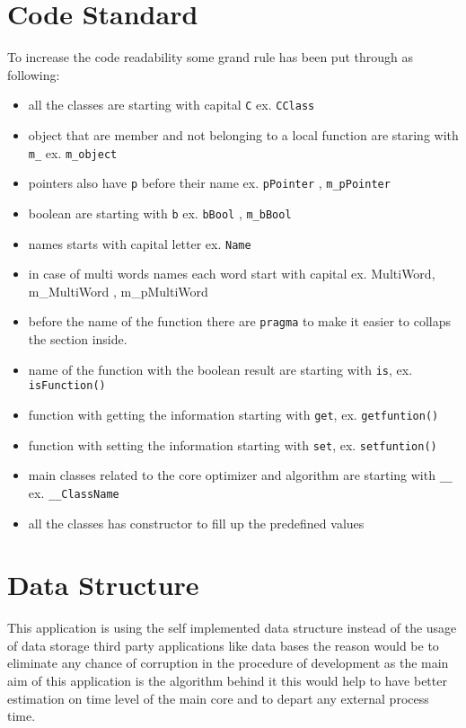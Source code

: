 \documentclass[oneside,titlepage,12pt]{memoir}
\begin{document}
\section{Code Standard}\label{code-standard}

To increase the code readability some grand rule has been put through as
following:

\begin{itemize}
\itemsep1pt\parskip0pt
\item
  all the classes are starting with capital \texttt{C} ex.
  \texttt{CClass}
\item
  object that are member and not belonging to a local function are
  staring with \texttt{m\_} ex. \texttt{m\_object}
\item
  pointers also have \texttt{p} before their name ex. \texttt{pPointer}
  , \texttt{m\_pPointer}
\item
  boolean are starting with \texttt{b} ex. \texttt{bBool} ,
  \texttt{m\_bBool}
\item
  names starts with capital letter ex. \texttt{Name}
\item
  in case of multi words names each word start with capital ex.
  MultiWord, m\_MultiWord , m\_pMultiWord
\item
  before the name of the function there are \texttt{pragma} to make it
  easier to collaps the section inside.
\item
  name of the function with the boolean result are starting with
  \texttt{is}, ex. \texttt{isFunction()}
\item
  function with getting the information starting with \texttt{get}, ex.
  \texttt{getfuntion()}
\item
  function with setting the information starting with \texttt{set}, ex.
  \texttt{setfuntion()}
\item
  main classes related to the core optimizer and algorithm are starting
  with \texttt{\_\_} ex. \texttt{\_\_ClassName}
\item
  all the classes has constructor to fill up the predefined values
\end{itemize}

\section{Data Structure}\label{data-structure}

This application is using the self implemented data structure instead of
the usage of data storage third party applications like data bases the
reason would be to eliminate any chance of corruption in the procedure
of development as the main aim of this application is the algorithm
behind it this would help to have better estimation on time level of the
main core and to depart any external process time.
\end{document}
